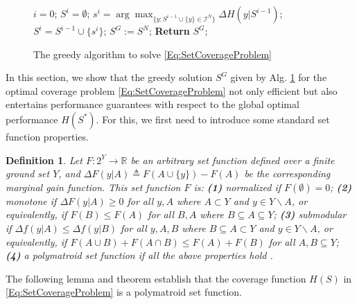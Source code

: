 \documentclass[letterpaper, 10 pt, conference]{ieeeconf}
\newcommand{\R}{\mathbb{R}}
\newtheorem{definition}{Definition}
\begin{document}
\begin{figure}
\vspace{-4mm}
\begin{algorithm}[H]
\small
\caption{The greedy algorithm to solve \eqref{Eq:SetCoverageProblem}}\label{Alg:GreedyAlgorithm}
\begin{algorithmic}[1]
\State $i=0$; $S^i = \emptyset$;  
    \State $s^{i} = \arg \max_{\{y:S^{i-1} \cup \{y\} \in \mathcal{I}^N\}} \Delta H(y \vert S^{i-1})$; 
    \State $S^{i} = S^{i-1} \cup \{s^{i}\}$; 
\EndFor
\State $S^G := S^N$;  \textbf{Return} $S^G$;
\end{algorithmic}
\end{algorithm}
\vspace{-5mm}
\end{figure}


In this section, we show that the greedy solution $S^G$ given by Alg. \ref{Alg:GreedyAlgorithm} for the optimal coverage problem \eqref{Eq:SetCoverageProblem} not only efficient but also entertains performance guarantees with respect to the global optimal performance $H(S^*)$. For this, we first need to introduce some standard set function properties.


\begin{definition} \cite{WelikalaJ02021} \label{Def:Submodularity} 
Let $F:2^Y \rightarrow \R$ be an arbitrary set function defined over a finite ground set $Y$, and $\Delta F(y \vert A) \triangleq F(A\cup\{y\}) - F(A)$ be the corresponding marginal gain function. This set function $F$ is:
\textbf{(1)} \emph{normalized} if $F(\emptyset) = 0$; 
\textbf{(2)} \emph{monotone} if $\Delta F(y \vert A)\geq 0$ for all $y,A$ where $A \subset Y$ and $y\in Y\backslash A$, or equivalently, if $F(B) \leq F(A)$ for all $B,A$ where $B \subseteq A \subseteq Y$;
\textbf{(3)} \emph{submodular} if $\Delta f(y\vert A) \leq \Delta f(y\vert B)$ for all $y,A,B$ where $B\subseteq A \subset Y$ and $y\in Y \backslash A$, or equivalently, if $F(A\cup B) + F(A\cap B) \leq F(A) + F(B)$ for all $A,B\subseteq Y$;  
\textbf{(4)} a \emph{polymatroid} set function if all the above properties hold \cite{Boros2003}. 
\end{definition}


The following lemma and theorem establish that the coverage function $H(S)$ in \eqref{Eq:SetCoverageProblem} is a polymatroid set function.
\end{document}
